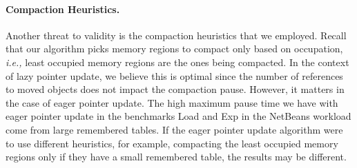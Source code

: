 \documentclass[sigplan,10pt,screen]{acmart}\settopmatter{printfolios=true,printccs=true,printacmref=true}
\newcommand{\todo}[1]{\color{orange}\fbox{\bfseries\sffamily\scriptsize TODO:}{\sf\small$\blacktriangleright$\textit{#1}$\blacktriangleleft$}\color{black}}
\def\ie{\emph{i.e., }}
\begin{document}
%

\paragraph{Compaction Heuristics.} 
Another threat to validity is the compaction heuristics that we employed.
Recall that our algorithm picks memory regions to compact only based on occupation, \ie least occupied memory regions are the ones being compacted. In the context of lazy pointer update, we believe this is optimal since the number of references to moved objects does not impact the compaction pause. %
However, it matters in the case of eager pointer update. The high maximum pause time we have with eager pointer update in the benchmarks Load and Exp in the NetBeans workload come from large remembered tables. If the eager pointer update algorithm were to use different heuristics, for example, compacting the least occupied memory regions only if they have a small remembered table, the results may be different. 

\end{document}
